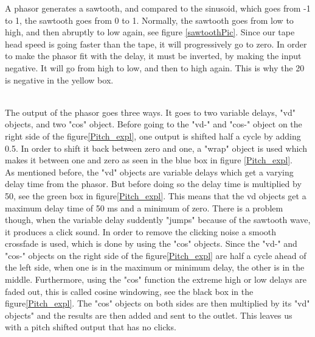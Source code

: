 A phasor generates a sawtooth, and compared to the sinusoid, which goes from -1 to 1, the sawtooth goes from 0 to 1\citep{FlossManuals}. Normally, the sawtooth goes from low to high, and then abruptly to low again, see figure \ref{sawtoothPic}. Since our tape head speed is going faster than the tape, it will progressively go to zero. In order to make the phasor fit with the delay, it must be inverted, by making the input negative. It will go from high to low, and then to high again. This is why the 20 is negative in the yellow box.   

\begin{minipage}{\linewidth}%
\label{sawtoothPic}
\end{minipage}\\

The output of the phasor goes three ways. It goes to two variable delays, "vd" objects, and two "cos" object. Before going to the "vd-" and "cos-" object on the right side of the figure\ref{Pitch_expl}, one output is shifted half a cycle by adding 0.5. In order to shift it back between zero and one, a "wrap" object is used which makes it between one and zero as seen in the blue box in figure \ref{Pitch_expl}.\\

As mentioned before, the "vd" objects are variable delays which get a varying delay time from the phasor. But before doing so the delay time is multiplied by 50, see the green box in figure\ref{Pitch_expl}. This means that the vd objects get a maximum delay time of 50 ms and a minimum of zero. There is a problem though, when the variable delay suddently "jumps" because of the sawtooth wave, it produces a click sound. In order to remove the clicking noise a smooth crossfade is used, which is done by using the "cos" objects. Since the "vd-" and "cos-" objects on the right side of the figure\ref{Pitch_expl} are half a cycle ahead of the left side, when one is in the maximum or minimum delay, the other is in the middle. Furthermore, using the "cos" function the extreme high or low delays are faded out, this is called cosine windowing, see the black box in the figure\ref{Pitch_expl}. The "cos" objects on both sides are then multiplied by its "vd" objects" and the results are then added and sent to the outlet. This leaves us with a pitch shifted output that has no clicks.  